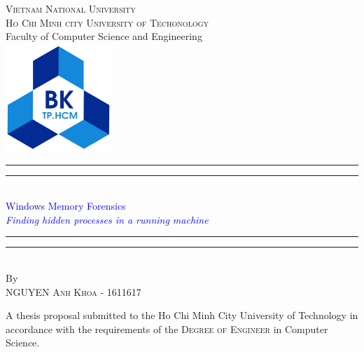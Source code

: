 \begin{titlingpage}
\begin{singlespace}

\begin{center}
{\Large \textsc{Vietnam National University \\Ho Chi Minh city University of Techonology}\\
\vspace{3mm}
Faculty of Computer Science and Engineering
}\\
\vspace{10mm}
\includegraphics[width=0.3\textwidth]{images/logo.png}\\
\vspace{1cm}
\rule[0.5ex]{\linewidth}{2pt}\vspace*{-\baselineskip}\vspace*{3.2pt}
\rule[0.5ex]{\linewidth}{1pt}\\[\baselineskip]
{\huge \textcolor{blue}{Windows Memory Forensics}}\\[4mm]
{\Large \textit{\textcolor{blue}{Finding hidden processes in a running machine}}}\\
\rule[0.5ex]{\linewidth}{1pt}\vspace*{-\baselineskip}\vspace{3.2pt}
\rule[0.5ex]{\linewidth}{2pt}\\
\vspace{6.5mm}
{\large By}\\
\vspace{6.5mm}
{\Large\textsc{NGUYEN Anh Khoa - 1611617}}\\
\vspace{15mm}

\begin{minipage}{10cm}
A thesis proposal submitted to the Ho Chi Minh City University of Technology in accordance with the requirements of the \textsc{Degree of Engineer} in Computer Science.
\end{minipage}\\



\end{center}
\end{singlespace}
\end{titlingpage}
